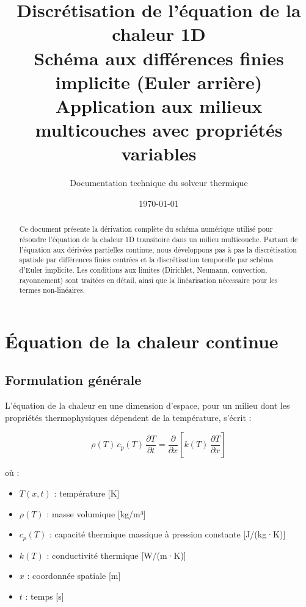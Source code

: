 \documentclass[11pt,a4paper]{article}
\title{
    \vspace{-1cm}
    {\LARGE \textbf{Discrétisation de l'équation de la chaleur 1D}} \\[0.5cm]
    {\large Schéma aux différences finies implicite (Euler arrière)} \\[0.3cm]
    {\normalsize Application aux milieux multicouches avec propriétés variables}
}
\author{Documentation technique du solveur thermique}
\date{\today}
\begin{document}
\maketitle

\begin{abstract}
Ce document présente la dérivation complète du schéma numérique utilisé pour résoudre l'équation de la chaleur 1D transitoire dans un milieu multicouche. Partant de l'équation aux dérivées partielles continue, nous développons pas à pas la discrétisation spatiale par différences finies centrées et la discrétisation temporelle par schéma d'Euler implicite. Les conditions aux limites (Dirichlet, Neumann, convection, rayonnement) sont traitées en détail, ainsi que la linéarisation nécessaire pour les termes non-linéaires.
\end{abstract}

\tableofcontents
\newpage

\section{Équation de la chaleur continue}

\subsection{Formulation générale}

L'équation de la chaleur en une dimension d'espace, pour un milieu dont les propriétés thermophysiques dépendent de la température, s'écrit :

\begin{tcolorbox}[colback=blue!5,colframe=bleu,title=\textbf{Équation de la chaleur 1D}]
\begin{equation}
\rho(T) \, c_p(T) \, \frac{\partial T}{\partial t} = \frac{\partial}{\partial x}\left[k(T) \, \frac{\partial T}{\partial x}\right]
\label{eq:chaleur}
\end{equation}
\end{tcolorbox}

où :
\begin{itemize}
    \item $T(x,t)$ : température [K]
    \item $\rho(T)$ : masse volumique [kg/m³]
    \item $c_p(T)$ : capacité thermique massique à pression constante [J/(kg·K)]
    \item $k(T)$ : conductivité thermique [W/(m·K)]
    \item $x$ : coordonnée spatiale [m]
    \item $t$ : temps [s]
\end{itemize}
\end{document}
